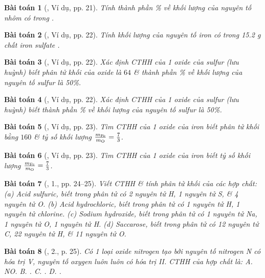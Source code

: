 \documentclass{article}
\newtheorem{baitoan}{Bài toán}
\begin{document}
\begin{baitoan}[\cite{An_Hoa_Hoc_nang_cao_8_9}, Ví dụ, pp. 21]
	Tính thành phần {\rm\%} về khối lượng của nguyên tố nhôm có trong {\rm{}}.
\end{baitoan}

\begin{baitoan}[\cite{An_Hoa_Hoc_nang_cao_8_9}, Ví dụ, pp. 22]
	Tính khối lượng của nguyên tố iron có trong {\rm15.2 g} chất iron sulfate {\rm{}}.
\end{baitoan}

\begin{baitoan}[\cite{An_Hoa_Hoc_nang_cao_8_9}, Ví dụ, pp. 22]
	Xác định {\rm CTHH} của 1 oxide của sulfur (lưu huỳnh) biết phân tử khối của oxide là $64$ \& thành phần {\rm\%} về khối lượng của nguyên tố sulfur là {\rm50\%}.
\end{baitoan}

\begin{baitoan}[\cite{An_Hoa_Hoc_nang_cao_8_9}, Ví dụ, pp. 22]
	Xác định {\rm CTHH} của 1 oxide của sulfur (lưu huỳnh) biết thành phần {\rm\%} về khối lượng của nguyên tố sulfur là {\rm50\%}.
\end{baitoan}

\begin{baitoan}[\cite{An_Hoa_Hoc_nang_cao_8_9}, Ví dụ, pp. 23]
	Tìm {\rm CTHH} của 1 oxide của iron biết phân tử khối bằng $160$ \& tỷ số khối lượng $\frac{m_{\rm Fe}}{m_{\rm O}} = \frac{7}{3}$.
\end{baitoan}

\begin{baitoan}[\cite{An_Hoa_Hoc_nang_cao_8_9}, Ví dụ, pp. 23]
	Tìm {\rm CTHH} của 1 oxide của iron biết tỷ số khối lượng $\frac{m_{\rm Fe}}{m_{\rm O}} = \frac{7}{3}$.
\end{baitoan}

\begin{baitoan}[\cite{An_Hoa_Hoc_nang_cao_8_9}, 1., pp. 24--25]
	Viết {\rm CTHH} \& tính phân tử khối của các hợp chất: (a) Acid sulfuric, biết trong phân tử có 2 nguyên tử {\rm H}, 1 nguyên tử {\rm S}, \& 4 nguyên tử {\rm O}. (b) Acid hydrochloric, biết trong phân tử có 1 nguyên tử {\rm H}, 1 nguyên tử chlorine. (c) Sodium hydroxide, biết trong phân tử có 1 nguyên tử {\rm Na}, 1 nguyên tử {\rm O}, 1 nguyên tử {\rm H}. (d) Saccarose, biết trong phân tử có 12 nguyên tử {\rm C}, 22 nguyên tử {\rm H}, \& 11 nguyên tử {\rm O}.
\end{baitoan}

\begin{baitoan}[\cite{An_Hoa_Hoc_nang_cao_8_9}, 2., p. 25]
	Có 1 loại oxide nitrogen tạo bởi nguyên tố nitrogen {\rm N} có hóa trị V, nguyên tố oxygen luôn luôn có hóa trị II. {\rm CTHH} của hợp chất là: {\sf A.} {\rm NO}. {\sf B.} {\rm{}}. {\sf C.} {\rm{}}. {\sf D.} {\rm{}}.
\end{baitoan}
\end{document}
